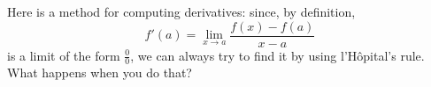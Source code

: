 Here is a method for computing derivatives: since, by
definition,
\[
f'(a) = \lim_{x\to a} \frac{f(x) - f(a)} {x-a}
\]
is a limit of the form $\frac00$, we can always try to find it by
using l'H\^{o}pital's rule.  What happens when you do that?
